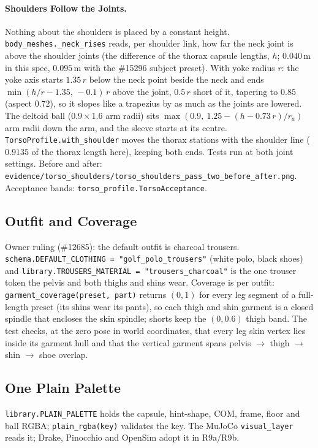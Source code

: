 \paragraph{Shoulders Follow the Joints.} Nothing about the shoulders is placed
by a constant height. \texttt{body\_meshes.\_neck\_rises} reads, per shoulder
link, how far the neck joint is above the shoulder joints (the difference of
the thorax capsule lengths, $h$; $0.040$\,m in this spec, $0.095$\,m with the
\#15296 subject preset). With yoke radius $r$: the yoke axis starts
$1.35\,r$ below the neck point beside the neck and ends
$\min(h/r-1.35,\,-0.1)\,r$ above the joint, $0.5\,r$ short of it, tapering to
$0.85$ (aspect $0.72$), so it slopes like a trapezius by as much as the joints
are lowered. The deltoid ball ($0.9\times1.6$ arm radii) sits
$\max(0.9,\ 1.25-(h-0.73\,r)/r_a)$ arm radii down the arm, and the sleeve
starts at its centre. \texttt{TorsoProfile.with\_shoulder} moves the thorax
stations with the shoulder line ($0.9135$ of the thorax length here), keeping
both ends. Tests run at both joint settings. Before and after:
\texttt{evidence/torso\_shoulders/torso\_shoulders\_pass\_two\_before\_after.png}.
Acceptance bands: \texttt{torso\_profile.TorsoAcceptance}.

\subsection{Outfit and Coverage}
Owner ruling (\#12685): the default outfit is charcoal trousers.
\texttt{schema.DEFAULT\_CLOTHING = "golf\_polo\_trousers"} (white polo, black
shoes) and \texttt{library.TROUSERS\_MATERIAL = "trousers\_charcoal"} is the one
trouser token the pelvis and both thighs and shins wear. Coverage is per
outfit: \texttt{garment\_coverage(preset, part)} returns $(0,1)$ for every leg
segment of a full-length preset (its shins wear its pants), so each thigh and
shin garment is a closed spindle that encloses the skin spindle; shorts keep
the $(0,0.6)$ thigh band. The test checks, at the zero pose in world
coordinates, that every leg skin vertex lies inside its garment hull and that
the vertical garment spans pelvis $\to$ thigh $\to$ shin $\to$ shoe overlap.

\subsection{One Plain Palette}
\texttt{library.PLAIN\_PALETTE} holds the capsule, hint-shape, COM, frame,
floor and ball RGBA; \texttt{plain\_rgba(key)} validates the key. The MuJoCo
\texttt{visual\_layer} reads it; Drake, Pinocchio and OpenSim adopt it in
R9a/R9b.

